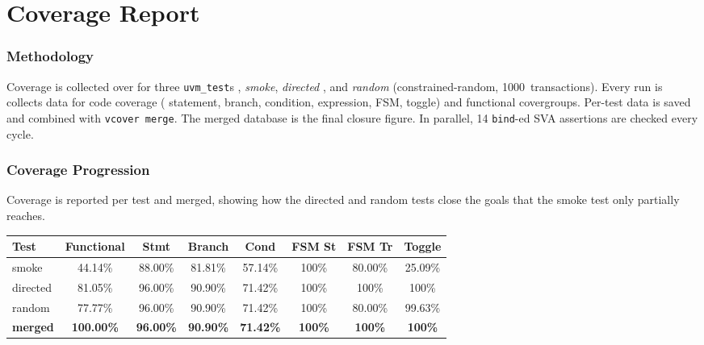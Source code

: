 \documentclass[11pt,a4paper]{article}
\begin{document}
{%
\newpage
\part{Coverage Report}

\section{Methodology}


Coverage is collected over for three \texttt{uvm\_test}s ,  \emph{smoke},
\emph{directed} , and \emph{random} (constrained-random,
1000~transactions). Every run is
collects data for code coverage ( statement,
branch, condition, expression, FSM, toggle) and functional
covergroups. Per-test data  is saved and combined
with \texttt{vcover merge}. The merged database is the final closure figure. In parallel,
14 \texttt{bind}-ed SVA assertions are checked every cycle.

\section{Coverage Progression}

Coverage is reported per test and merged, showing how the directed and random
tests close the goals that the smoke test only partially reaches.

\begin{table}[H]
\centering
\footnotesize
\begin{tabular}{lccccccc}
\toprule
\textbf{Test} & \textbf{Functional} & \textbf{Stmt} & \textbf{Branch} & \textbf{Cond} & \textbf{FSM St} & \textbf{FSM Tr} & \textbf{Toggle} \\
\midrule
smoke              & 44.14\% & 88.00\% & 81.81\% & 57.14\% & 100\% & 80.00\%  & 25.09\% \\
directed           & 81.05\% & 96.00\% & 90.90\% & 71.42\% & 100\% & 100\%    & 100\%   \\
random             & 77.77\% & 96.00\% & 90.90\% & 71.42\% & 100\% & 80.00\%  & 99.63\% \\
\midrule
\textbf{merged}    & \textbf{100.00\%} & \textbf{96.00\%} & \textbf{90.90\%} & \textbf{71.42\%} & \textbf{100\%} & \textbf{100\%} & \textbf{100\%} \\
\bottomrule
\end{tabular}
\end{table}

}
\end{document}
